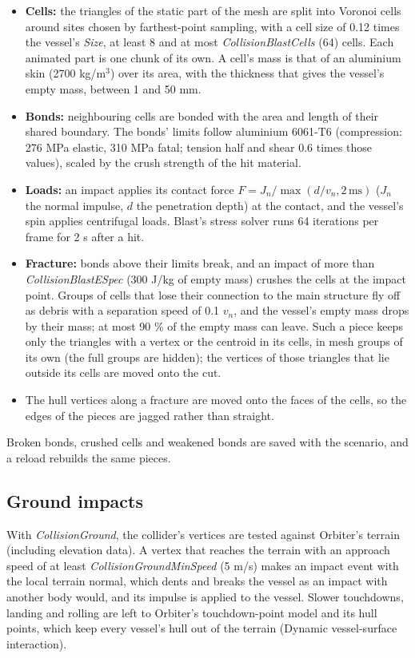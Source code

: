\documentclass[Orbiter Technical Reference.tex]{subfiles}
\begin{document}
\begin{itemize}
\item \textbf{Cells:} the triangles of the static part of the mesh are split into Voronoi cells around sites chosen by farthest-point sampling, with a cell size of 0.12 times the vessel's \textit{Size}, at least 8 and at most \textit{CollisionBlastCells} (64) cells. Each animated part is one chunk of its own. A cell's mass is that of an aluminium skin (2700 kg/m$^{3}$) over its area, with the thickness that gives the vessel's empty mass, between 1 and 50 mm.
\item \textbf{Bonds:} neighbouring cells are bonded with the area and length of their shared boundary. The bonds' limits follow aluminium 6061-T6 (compression: 276 MPa elastic, 310 MPa fatal; tension half and shear 0.6 times those values), scaled by the crush strength of the hit material.
\item \textbf{Loads:} an impact applies its contact force $F = J_{n} / \max(d/v_{n}, \mathrm{2\,ms})$ ($J_{n}$ the normal impulse, $d$ the penetration depth) at the contact, and the vessel's spin applies centrifugal loads. Blast's stress solver runs 64 iterations per frame for 2 s after a hit.
\item \textbf{Fracture:} bonds above their limits break, and an impact of more than \textit{CollisionBlastESpec} (300 J/kg of empty mass) crushes the cells at the impact point. Groups of cells that lose their connection to the main structure fly off as debris with a separation speed of 0.1 $v_{n}$, and the vessel's empty mass drops by their mass; at most 90 \% of the empty mass can leave. Such a piece keeps only the triangles with a vertex or the centroid in its cells, in mesh groups of its own (the full groups are hidden); the vertices of those triangles that lie outside its cells are moved onto the cut.
\item The hull vertices along a fracture are moved onto the faces of the cells, so the edges of the pieces are jagged rather than straight.
\end{itemize}

\noindent
Broken bonds, crushed cells and weakened bonds are saved with the scenario, and a reload rebuilds the same pieces.


\subsection{Ground impacts}
With \textit{CollisionGround}, the collider's vertices are tested against Orbiter's terrain (including elevation data). A vertex that reaches the terrain with an approach speed of at least \textit{CollisionGroundMinSpeed} (5 m/s) makes an impact event with the local terrain normal, which dents and breaks the vessel as an impact with another body would, and its impulse is applied to the vessel. Slower touchdowns, landing and rolling are left to Orbiter's touchdown-point model and its hull points, which keep every vessel's hull out of the terrain (Dynamic vessel-surface interaction).
\end{document}
